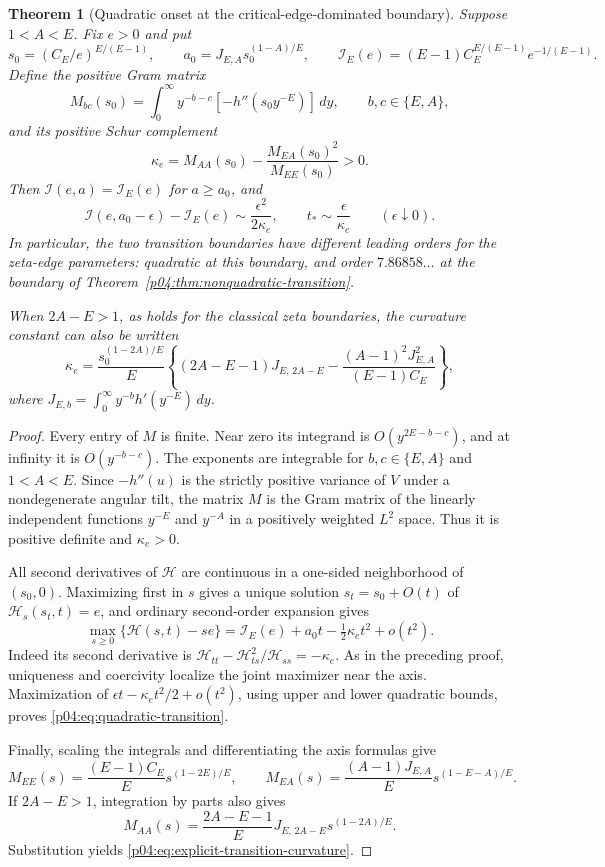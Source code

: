 \documentclass[11pt,letterpaper]{article}
\newtheorem{theorem}{Theorem}[section]
\theoremstyle{definition}
\theoremstyle{remark}
\newcommand{\1}{\mathbf 1}
\begin{document}
\begin{theorem}[Quadratic onset at the critical-edge-dominated boundary]
\label{p04:thm:quadratic-transition}
Suppose $1<A<E$. Fix $e>0$ and put
\[
 s_0=(C_E/e)^{E/(E-1)},\qquad
 a_0=J_{E,A}s_0^{(1-A)/E},\qquad
 \mathcal I_E(e)=(E-1)C_E^{E/(E-1)}e^{-1/(E-1)}.
\]
Define the positive Gram matrix
\[
 M_{bc}(s_0)=\int_0^\infty
           y^{-b-c}[-h''(s_0y^{-E})]\,dy,
             \qquad b,c\in\{E,A\},
\]
and its positive Schur complement
\[
 \kappa_e=M_{AA}(s_0)-\frac{M_{EA}(s_0)^2}{M_{EE}(s_0)}>0.
\]
Then $\mathcal I(e,a)=\mathcal I_E(e)$ for $a\ge a_0$, and
\begin{equation}\label{p04:eq:quadratic-transition}
 \mathcal I(e,a_0-\epsilon)-\mathcal I_E(e)
 \sim\frac{\epsilon^2}{2\kappa_e},\qquad
 t_*\sim\frac\epsilon{\kappa_e}\qquad(\epsilon\downarrow0).
\end{equation}
In particular, the two transition boundaries have different leading
orders for the zeta-edge parameters: quadratic at this boundary,
and order $7.86858\ldots$ at the boundary of
Theorem~\ref{p04:thm:nonquadratic-transition}.

When $2A-E>1$, as holds for the classical zeta boundaries, the
curvature constant can also be written
\begin{equation}\label{p04:eq:explicit-transition-curvature}
 \kappa_e=\frac{s_0^{(1-2A)/E}}E
 \left\{(2A-E-1)J_{E,\,2A-E}
       -\frac{(A-1)^2J_{E,A}^2}{(E-1)C_E}\right\},
\end{equation}
where $J_{E,b}=\int_0^\infty y^{-b}h'(y^{-E})\,dy$.
\end{theorem}

\begin{proof}
Every entry of $M$ is finite. Near zero its integrand is
$O(y^{2E-b-c})$, and at infinity it is $O(y^{-b-c})$.
The exponents are integrable for $b,c\in\{E,A\}$ and
$1<A<E$. Since $-h''(u)$ is the strictly positive variance of
$V$ under a nondegenerate angular tilt, the matrix $M$ is the
Gram matrix of the linearly independent functions $y^{-E}$ and
$y^{-A}$ in a positively weighted $L^2$ space. Thus it is
positive definite and $\kappa_e>0$.

All second derivatives of $\mathcal H$ are continuous in a
one-sided neighborhood of $(s_0,0)$. Maximizing first in $s$
gives a unique solution $s_t=s_0+O(t)$ of
$\mathcal H_s(s_t,t)=e$, and ordinary second-order expansion gives
\[
 \max_{s\ge0}\{\mathcal H(s,t)-se\}
 =\mathcal I_E(e)+a_0t-\tfrac12\kappa_e t^2+o(t^2).
\]
Indeed its second derivative is
$\mathcal H_{tt}-\mathcal H_{ts}^2/\mathcal H_{ss}=-\kappa_e$.
As in the preceding proof, uniqueness and coercivity localize the
joint maximizer near the axis. Maximization of
$\epsilon t-\kappa_e t^2/2+o(t^2)$, using upper and lower
quadratic bounds, proves \eqref{p04:eq:quadratic-transition}.

Finally, scaling the integrals and differentiating the axis formulas
give
\[
 M_{EE}(s)=\frac{(E-1)C_E}{E}s^{(1-2E)/E},\qquad
 M_{EA}(s)=\frac{(A-1)J_{E,A}}E s^{(1-E-A)/E}.
\]
If $2A-E>1$, integration by parts also gives
\[
 M_{AA}(s)=\frac{2A-E-1}E
      J_{E,\,2A-E}s^{(1-2A)/E}.
\]
Substitution yields \eqref{p04:eq:explicit-transition-curvature}.
\end{proof}
\end{document}
